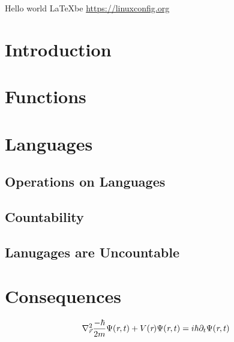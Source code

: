 \documentclass[a4paper,11pt]{article}
\begin{document}
Hello world \LaTeX be \url{https://linuxconfig.org}
\section{Introduction}
\section{Functions}
\section{Languages}
\subsection{Operations on Languages}
\subsection{Countability}
\subsection{Lanugages are Uncountable}
\section{Consequences}
\begin{equation}
  \nabla^2_{\vec{r}} \frac{-\hbar}{2m} \Psi(\emph{r}, t) + V(\emph{r})\Psi(\emph{r}, t) = i\hbar \partial_t \Psi(\emph{r}, t)
\end{equation}
\end{document}
